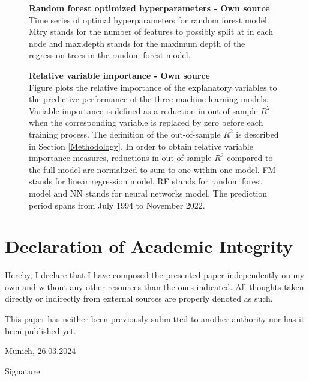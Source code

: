 \documentclass[12pt]{article}
\begin{document}
\begin{appendices}
\begin{figure}[H]
\centering
\caption[Optimized random forest hyperparameters]{\textbf{Random forest optimized hyperparameters \textnormal{- Own source}}\\ Time series of optimal hyperparameters for random forest model. Mtry stands for the number of features to possibly split at in each node and max.depth stands for the maximum depth of the regression trees in the random forest model.}

\label{plot:RFHyperParams}
\end{figure}

\begin{figure}[H]
\centering
\caption[Relative variable importance]{\textbf{Relative variable importance \textnormal{- Own source}}\\ Figure plots the relative importance of the explanatory variables to the predictive performance of the three machine learning models. Variable importance is defined as a reduction in out-of-sample $R^2$ when the corresponding variable is replaced by zero before each training process. The definition of the out-of-sample $R^2$ is described in Section \ref{Methodology}. In order to obtain relative variable importance measures, reductions in out-of-sample $R^2$ compared to the full model are normalized to sum to one within one model. FM stands for linear regression model, RF stands for random forest model and NN stands for neural networks model. The prediction period spans from July 1994 to November 2022.}

\label{plot:relative_VI}
\end{figure}

\end{appendices}

\clearpage




\clearpage

\section*{Declaration of Academic Integrity}

Hereby, I declare that I have composed the presented paper independently on my own and without any other resources than the ones indicated. All thoughts taken directly or indirectly from external sources are properly denoted as such. \par

This paper has neither been previously submitted to another authority nor has it been published yet. \vspace{20pt}

Munich, 26.03.2024 \vspace{30pt}

Signature
\end{document}
